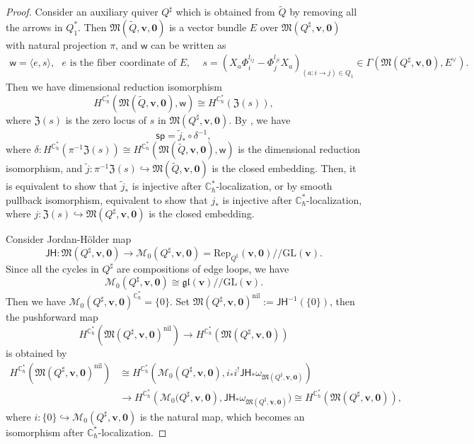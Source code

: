 \documentclass[10pt]{amsart}
\theoremstyle{definition}
\numberwithin{equation}{section}
\newcommand{\GL}{\mathrm{GL}}
\newcommand{\bC}{\mathbb{C}}
\newcommand{\bv}{\mathbf{v}}
\newcommand{\cM}{\mathcal{M}}
\newcommand{\fM}{\mathfrak{M}}
\newcommand{\sw}{\mathsf{w}}
\begin{document}
\begin{proof}
Consider an auxiliary quiver $Q^\sharp$ which is obtained from $\widetilde Q$ by removing all the arrows in $Q_1^*$. Then $\fM(\widetilde{Q},\bv,\mathbf 0)$ is a vector bundle $E$ over $\fM(Q^\sharp,\bv,\mathbf 0)$ with natural projection $\pi$, and $\sw$ can be written as 
\begin{align*}
    \sw=\langle e,s\rangle,\text{ $e$ is the fiber coordinate of $E$, }\quad s=(X_a\Phi_i^{l_{ij}}-\Phi_j^{l_{ji}}X_a)_{(a:i\to j)\in Q_1}\in \Gamma(\fM(Q^\sharp,\bv,\mathbf 0),E^\vee).
\end{align*}
Then we have dimensional reduction isomorphism 
$$H^{\bC^*_\hbar}\left(\fM(\widetilde{Q},\bv,\mathbf 0),\sw\right)\cong H^{\bC^*_\hbar}(\mathfrak{Z}(s)), $$ 
where $\mathfrak{Z}(s)$ is the zero locus of $s$ in $\fM(Q^\sharp,\bv,\mathbf 0)$. By \cite[Rem.\,\,7.16]{COZZ}, we have 
$$\mathsf{sp}=\tilde j_*\circ \delta^{-1}, $$ 
where $\delta\colon H^{\bC^*_\hbar}(\pi^{-1}\mathfrak{Z}(s))\cong H^{\bC^*_\hbar}(\fM(\widetilde{Q},\bv,\mathbf 0),\sw)$ is the dimensional reduction isomorphism, and $\tilde j\colon \pi^{-1}\mathfrak{Z}(s)\hookrightarrow \fM(\widetilde{Q},\bv,\mathbf 0)$ is the closed embedding. Then, it is equivalent to show that $\tilde j_*$ is injective after $\bC^*_\hbar$-localization, or by smooth pullback isomorphism, equivalent to show that $j_*$ is injective after $\bC^*_\hbar$-localization, where $j\colon \mathfrak{Z}(s)\hookrightarrow \fM(Q^\sharp,\bv,\mathbf 0)$ is the closed embedding.

Consider Jordan-H\"older map 
$$\mathsf{JH}\colon \fM\left(Q^\sharp,\bv,\mathbf 0\right)\to \cM_0\left(Q^\sharp,\bv,\mathbf 0\right)=\mathrm{Rep}_{Q^\sharp}(\bv,\mathbf 0)/\!\!/\GL(\bv). $$ 
Since all the cycles in $Q^\sharp$ are compositions of edge loops, we have 
$$\cM_0\left(Q^\sharp,\bv,\mathbf 0\right)\cong \mathfrak{gl}(\bv)/\!\!/\GL(\bv). $$ 
Then we have $\cM_0\left(Q^\sharp,\bv,\mathbf 0\right)^{\bC^*_\hbar}=\{0\}$. Set $\fM(Q^\sharp,\bv,\mathbf 0)^{\mathrm{nil}}:=\mathsf{JH}^{-1}(\{0\})$, then the pushforward map 
$$H^{\bC^*_\hbar}\left(\fM(Q^\sharp,\bv,\mathbf 0)^{\mathrm{nil}}\right)\to H^{\bC^*_\hbar}\left(\fM(Q^\sharp,\bv,\mathbf 0)\right)$$ is obtained by
\begin{align*}
H^{\bC^*_\hbar}\left(\fM(Q^\sharp,\bv,\mathbf 0)^{\mathrm{nil}}\right)&\cong  H^{\bC^*_\hbar}\left(\cM_0(Q^\sharp,\bv,\mathbf 0), i_*i^!\mathsf{JH}_*\omega_{\fM(Q^\sharp,\bv,\mathbf 0)}\right) \\
&\to H^{\bC^*_\hbar}\left(\cM_0(Q^\sharp,\bv,\mathbf 0\right), \mathsf{JH}_*\omega_{\fM(Q^\sharp,\bv,\mathbf 0)})\cong  H^{\bC^*_\hbar}\left(\fM(Q^\sharp,\bv,\mathbf 0)\right),
\end{align*}
where $i\colon \{0\}\hookrightarrow \cM_0(Q^\sharp,\bv,\mathbf 0)$ is the natural map, which becomes an isomorphism after $\bC^*_\hbar$-localization. 


\end{proof}
\end{document}
